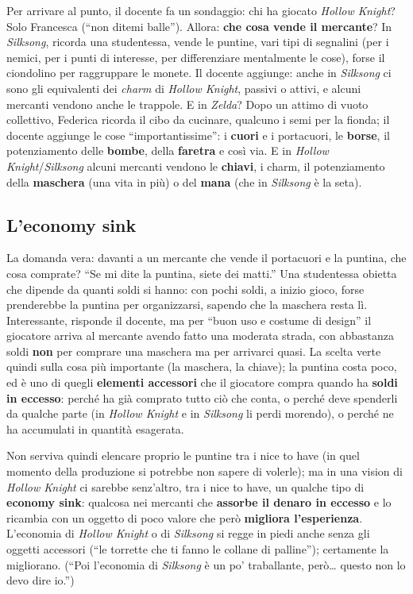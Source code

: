 Per arrivare al punto, il docente fa un sondaggio: chi ha giocato
\emph{Hollow Knight}? Solo Francesca (``non ditemi balle''). Allora:
\textbf{che cosa vende il mercante}? In \emph{Silksong}, ricorda una
studentessa, vende le puntine, vari tipi di segnalini (per i nemici, per i
punti di interesse, per differenziare mentalmente le cose), forse il
ciondolino per raggruppare le monete. Il docente aggiunge: anche in
\emph{Silksong} ci sono gli equivalenti dei \emph{charm} di \emph{Hollow
Knight}, passivi o attivi, e alcuni mercanti vendono anche le trappole.
E in \emph{Zelda}? Dopo un attimo di vuoto collettivo, Federica ricorda il
cibo da cucinare, qualcuno i semi per la fionda; il docente aggiunge le cose
``importantissime'': i \textbf{cuori} e i portacuori, le \textbf{borse}, il
potenziamento delle \textbf{bombe}, della \textbf{faretra} e così via. E in
\emph{Hollow Knight}/\emph{Silksong} alcuni mercanti vendono le
\textbf{chiavi}, i charm, il potenziamento della \textbf{maschera} (una vita
in più) o del \textbf{mana} (che in \emph{Silksong} è la seta).

\subsection{L'economy sink}

La domanda vera: davanti a un mercante che vende il portacuori e la puntina,
che cosa comprate? ``Se mi dite la puntina, siete dei matti.'' Una
studentessa obietta che dipende da quanti soldi si hanno: con pochi soldi, a
inizio gioco, forse prenderebbe la puntina per organizzarsi, sapendo che la
maschera resta lì. Interessante, risponde il docente, ma per ``buon uso e
costume di design'' il giocatore arriva al mercante avendo fatto una
moderata strada, con abbastanza soldi \textbf{non} per comprare una maschera
ma per arrivarci quasi. La scelta verte quindi sulla cosa più importante (la
maschera, la chiave); la puntina costa poco, ed è uno di quegli
\textbf{elementi accessori} che il giocatore compra quando ha \textbf{soldi
in eccesso}: perché ha già comprato tutto ciò che conta, o perché deve
spenderli da qualche parte (in \emph{Hollow Knight} e in \emph{Silksong} li
perdi morendo), o perché ne ha accumulati in quantità esagerata.

Non serviva quindi elencare proprio le puntine tra i nice to have (in quel
momento della produzione si potrebbe non sapere di volerle); ma in una vision
di \emph{Hollow Knight} ci sarebbe senz'altro, tra i nice to have, un qualche
tipo di \textbf{economy sink}: qualcosa nei mercanti che \textbf{assorbe il
denaro in eccesso} e lo ricambia con un oggetto di poco valore che però
\textbf{migliora l'esperienza}. L'economia di \emph{Hollow Knight} o di
\emph{Silksong} si regge in piedi anche senza gli oggetti accessori (``le
torrette che ti fanno le collane di palline''); certamente la migliorano.
(``Poi l'economia di \emph{Silksong} è un po' traballante, però\ldots
questo non lo devo dire io.'')

